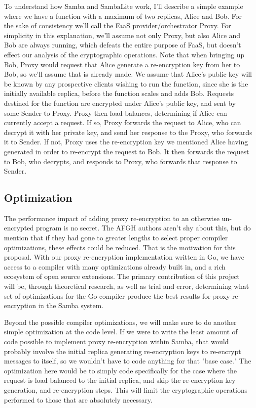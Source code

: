 To understand how Samba and SambaLite work, I'll describe a simple example where we have a function with a maximum of two replicas, Alice and Bob.
For the sake of consistency we'll call the FaaS provider/orchestrator Proxy.
For simplicity in this explanation, we'll assume not only Proxy, but also Alice and Bob are always running, which defeats the entire purpose of FaaS, but doesn't effect our analysis of the cryptographic operations.
Note that when bringing up Bob, Proxy would request that Alice generate a re-encryption key from her to Bob, so we'll assume that is already made.
We assume that Alice's public key will be known by any prospective clients wishing to run the function, since she is the initially available replica, before the function scales and adds Bob.
Requests destined for the function are encrypted under Alice's public key, and sent by some Sender to Proxy.
Proxy then load balances, determining if Alice can currently accept a request.
If so, Proxy forwards the request to Alice, who can decrypt it with her private key, and send her response to the Proxy, who forwards it to Sender.
If not, Proxy uses the re-encryption key we mentioned Alice having generated in order to re-encrypt the request to Bob.
It then forwards the request to Bob, who decrypts, and responds to  Proxy, who forwards that response to Sender.

\subsection{Optimization}
\label{sec:optimization_design}

The performance impact of adding proxy re-encryption to an otherwise un-encrypted program is no secret.
The AFGH authors aren't shy about this, but do mention that if they had gone to greater lengths to select proper compiler optimizations, these effects could be reduced.
\cite{afgh}
That is the motivation for this proposal.
With our proxy re-encryption implementation written in Go, we have access to a compiler with many optimizations already built in, and a rich ecosystem of open source extensions.
The primary contribution of this project will be, through theoretical research, as well as trial and error, determining what set of optimizations for the Go compiler produce the best results for proxy re-encryption in the Samba system.

Beyond the possible compiler optimizations, we will make sure to do another simple optimization at the code level.
If we were to write the least amount of code possible to implement proxy re-encryption within Samba, that would probably involve the initial replica generating re-encryption keys to re-encrypt messages to itself, so we wouldn't have to code anything for that "base case."
The optimization here would be to simply code specifically for the case where the request is load balanced to the initial replica, and skip the re-encryption key generation, and re-encryption steps.
This will limit the cryptographic operations performed to those that are absolutely necessary.

